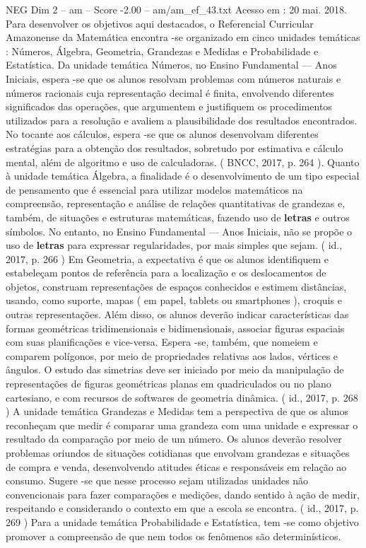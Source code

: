 \begin{textsample}{NEG Dim 2 – am – Score -2.00 – am/am\_ef\_43.txt}
Acesso em : 20 mai. 2018.
Para desenvolver os objetivos aqui destacados, o Referencial Curricular Amazonense da Matemática encontra -se organizado em cinco unidades temáticas : Números, Álgebra, Geometria, Grandezas e Medidas e Probabilidade e Estatística.
Da unidade temática Números, no Ensino Fundamental — Anos Iniciais, espera -se que os alunos resolvam problemas com números naturais e números racionais cuja representação decimal é finita, envolvendo diferentes significados das operações, que argumentem e justifiquem os procedimentos utilizados para a resolução e avaliem a plausibilidade dos resultados encontrados.
No tocante aos cálculos, espera -se que os alunos desenvolvam diferentes estratégias para a obtenção dos resultados, sobretudo por estimativa e cálculo mental, além de algoritmo e uso de calculadoras. ( BNCC, 2017, p. 264 ).
Quanto à unidade temática Álgebra, a finalidade é o desenvolvimento de um tipo especial de pensamento que é essencial para utilizar modelos matemáticos na compreensão, representação e análise de relações quantitativas de grandezas e, também, de situações e estruturas matemáticas, fazendo uso de \textbf{letras} e outros símbolos.
No entanto, no Ensino Fundamental — Anos Iniciais, não se propõe o uso de \textbf{letras} para expressar regularidades, por mais simples que sejam. ( id., 2017, p. 266 ) Em Geometria, a expectativa é que os alunos identifiquem e estabeleçam pontos de referência para a localização e os deslocamentos de objetos, construam representações de espaços conhecidos e estimem distâncias, usando, como suporte, mapas ( em papel, tablets ou smartphones ), croquis e outras representações.
Além disso, os alunos deverão indicar características das formas geométricas tridimensionais e bidimensionais, associar figuras espaciais com suas planificações e vice-versa.
Espera -se, também, que nomeiem e comparem polígonos, por meio de propriedades relativas aos lados, vértices e ângulos.
O estudo das simetrias deve ser iniciado por meio da manipulação de representações de figuras geométricas planas em quadriculados ou no plano cartesiano, e com recursos de softwares de geometria dinâmica. ( id., 2017, p. 268 ) A unidade temática Grandezas e Medidas tem a perspectiva de que os alunos reconheçam que medir é comparar uma grandeza com uma unidade e expressar o resultado da comparação por meio de um número.
Os alunos deverão resolver problemas oriundos de situações cotidianas que envolvam grandezas e situações de compra e venda, desenvolvendo atitudes éticas e responsáveis em relação ao consumo.
Sugere -se que nesse processo sejam utilizadas unidades não convencionais para fazer comparações e medições, dando sentido à ação de medir, respeitando e considerando o contexto em que a escola se encontra. ( id., 2017, p. 269 ) Para a unidade temática Probabilidade e Estatística, tem -se como objetivo promover a compreensão de que nem todos os fenômenos são determinísticos.

\end{textsample}
